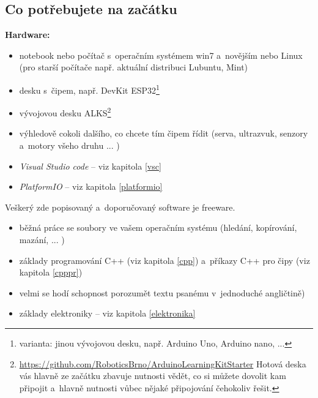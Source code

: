 \subsection{Co potřebujete na začátku}

{\bf Hardware: }

\begin{itemize} %
\item  notebook nebo počítač s~operačním systémem win7 a~novějším nebo Linux (pro starší počítače např. aktuální distribuci Lubuntu, Mint)

\item  desku s~čipem, např. DevKit ESP32\footnote{varianta: jinou vývojovou desku, např. Arduino Uno, Arduino nano, ...  }
\item  vývojovou desku ALKS\footnote{\url{https://github.com/RoboticsBrno/ArduinoLearningKitStarter} \hfil {} 
Hotová deska vás hlavně ze začátku zbavuje nutnosti vědět, co si můžete dovolit kam připojit a~hlavně nutnosti vůbec nějaké připojování čehokoliv řešit. } 

\item výhledově cokoli dalšího, co chcete tím čipem řídit (serva, ultrazvuk, senzory a~motory všeho druhu ... ) 
\end{itemize}

\begin{itemize} %
\item  {\it Visual Studio code} -- viz kapitola \ref{vsc}
\item  {\it PlatformIO }-- viz kapitola \ref{platformio}
\end{itemize}
Veškerý zde popisovaný a~doporučovaný software je freeware. 

\begin{itemize} %
\item  běžná práce se soubory ve vašem operačním systému (hledání, kopírování, mazání, ... )
\item  základy programování C++ (viz kapitola \ref{cpp}) a~příkazy C++ pro čipy (viz kapitola \ref{cpppr}) 
\item velmi se hodí schopnost porozumět textu psanému v~jednoduché angličtině) 
\item  základy elektroniky -- viz kapitola \ref{elektronika}
\end{itemize}

